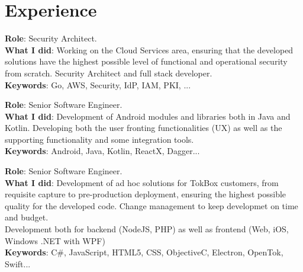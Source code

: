 \documentclass[]{resume}
\begin{document}
\lastupdated


\begin{minipage}[t]{0.66\textwidth}

\section{Experience}
\textbf{Role}: Security Architect.\\
\textbf{What I did}: Working on the Cloud Services area, ensuring that the developed solutions have the highest possible level of functional and operational security from scratch. Security Architect and full stack developer. \\
\textbf{Keywords}: Go, AWS, Security, IdP, IAM, PKI, ...
\sectionsep

\textbf{Role}: Senior Software Engineer.\\
\textbf{What I did}: Development of Android modules and libraries both in Java and Kotlin. Developing both the user fronting functionalities (UX) as well as the supporting functionality and some integration tools.\\
\textbf{Keywords}: Android, Java, Kotlin, ReactX, Dagger...
\sectionsep

\textbf{Role}: Senior Software Engineer.\\
\textbf{What I did}: Development of ad hoc solutions for TokBox customers, from requisite capture to pre-production deployment, ensuring the highest possible quality for the developed code. Change management to keep developmet on time and budget.\\
Development both for backend (NodeJS, PHP) as well as frontend (Web, iOS, Windows .NET with WPF)\\
\textbf{Keywords}: C\#, JavaScript, HTML5, CSS, ObjectiveC, Electron, OpenTok, Swift...
\sectionsep


\end{minipage}
\end{document}
